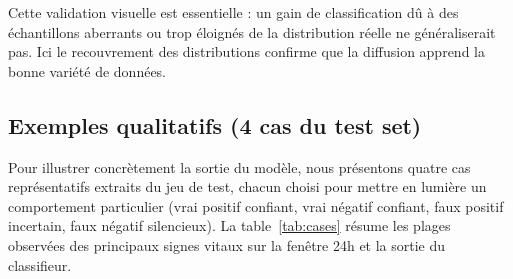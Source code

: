 \documentclass[11pt,a4paper]{article}
\begin{document}
Cette validation visuelle est essentielle : un gain de classification dû à des
échantillons aberrants ou trop éloignés de la distribution réelle ne
généraliserait pas. Ici le recouvrement des distributions confirme que la
diffusion apprend la bonne variété de données.

\subsection{Exemples qualitatifs (4 cas du test set)}

Pour illustrer concrètement la sortie du modèle, nous présentons quatre cas
représentatifs extraits du jeu de test, chacun choisi pour mettre en lumière
un comportement particulier (vrai positif confiant, vrai négatif confiant,
faux positif incertain, faux négatif silencieux). La table~\ref{tab:cases}
résume les plages observées des principaux signes vitaux sur la fenêtre 24h
et la sortie du classifieur.

\begin{table}[H]
\centering
\caption{Quatre cas extraits du test set (10\% de labels). Plages des signes vitaux
observés sur la fenêtre 24h, probabilité prédite par le modèle (moyenne sur 50
passes MC Dropout), variance associée, et décision binaire au seuil de Youden 0.0020.
Les unités : HR en battements/min, MAP et SBP en mmHg, Temp en °C, Lactate en mmol/L.}
\label{tab:cases}
\renewcommand{\arraystretch}{1.3}
\end{table}
\end{document}
